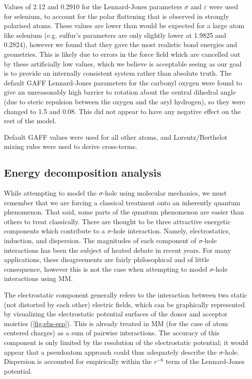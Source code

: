\begin{refsection}
Values of 2.12 and 0.2910 for the Lennard-Jones parameters $\sigma$ and $\varepsilon$ were used for selenium, to account for the polar flattening that is observed in strongly polarised atoms.
These values are lower than would be expected for a large atom like selenium (e.g. sulfur's parameters are only slightly lower at 1.9825 and 0.2824), however we found that they gave the most realistic bond energies and geometries.
This is likely due to errors in the force field which are cancelled out by these artificially low values, which we believe is acceptable seeing as our goal is to provide an internally consistent system rather than absolute truth. 
The default GAFF Lennard-Jones parameters for the carbonyl oxygen were found to give an unreasonably high barrier to rotation about the central dihedral angle (due to steric repulsion between the oxygen and the aryl hydrogen), so they were changed to 1.5 and 0.08.
This did not appear to have any negative effect on the rest of the model.

Default GAFF values were used for all other atoms, and Lorentz/Berthelot mixing rules were used to derive cross-terms.

\subsection{Energy decomposition analysis}
While attempting to model the $\sigma$-hole using molecular mechanics, we must remember that we are forcing a classical treatment onto an inherently quantum phenomenon.
That said, some parts of the quantum phenomenon are easier than others to treat classically.
There are thought to be three attractive energetic components which contribute to a $\sigma$-hole interaction.
Namely, electrostatics, induction, and dispersion.\autocite{Bleiholder2006,Bleiholder2007,Pascoe2017}
The magnitudes of each component of $\sigma$-hole interactions has been the subject of heated debate in recent years.
For many applications, these disagreements are fairly philosophical and of little consequence, however this is not the case when attempting to model $\sigma$-hole interactions using MM.

The electrostatic component generally refers to the interaction between two static (not distorted by each other) electric fields, which can be graphically represented by visualizing the electrostatic potential surfaces of the donor and acceptor moieties (\cref{fig:ebs-esp}).
This is already treated in MM (for the case of atom centered charges) as a sum of pairwise interactions.
The accuracy of this component is only limited by the resolution of the electrostatic potential; it would appear that a pseudoatom approach could thus adequately describe the $\sigma$-hole.
Dispersion is accounted for empirically within the $r^{-6}$ term of the Lennard-Jones potential.


\end{refsection}
